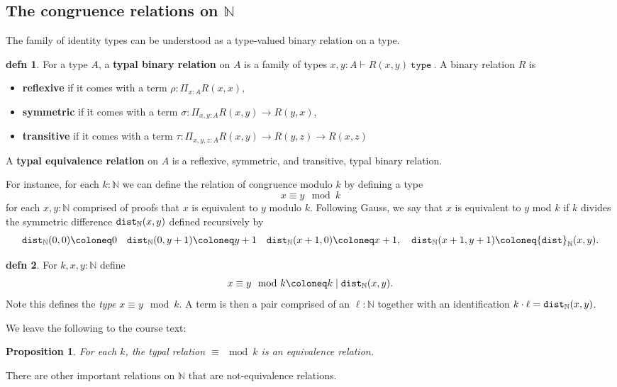 \documentclass{amsart}
\theoremstyle{theorem}
\newtheorem*{prop}{Proposition}
\theoremstyle{definition}
\newtheorem*{defn}{defn}
\theoremstyle{remark}
\newcommand{\0}{\mathbbe{0}}
\newcommand{\1}{\mathbbe{1}}
\newcommand{\2}{\mathbbe{2}}
\newcommand{\3}{\mathbbe{3}}
\newcommand{\4}{\mathbbe{4}}
\newcommand{\univ}{{~\texttt{type}~}}
\newcommand{\term}[1]{{\textup{\texttt{#1}}}}
\newcommand{\bN}{{\mathbb{N}}}
\begin{document}
\subsection*{The congruence relations on \texorpdfstring{$\bN$}{N}}

The family of identity types can be understood as a type-valued binary relation on a type.

\begin{defn} For a type $A$, a \textbf{typal binary relation} on $A$ is a family of types $x, y : A \vdash R(x,y) \univ$. A binary relation $R$ is 
\begin{itemize}
\item \textbf{reflexive} if it comes with a term $\rho : \Pi_{x :A} R(x,x)$,
\item \textbf{symmetric} if it comes with a term $\sigma : \Pi_{x,y :A} R(x,y) \to R(y,x)$,
\item \textbf{transitive} if it comes with a term $\tau : \Pi_{x,y,z : A}  R(x,y) \to R(y,z) \to R(x,z)$
\end{itemize}
A \textbf{typal equivalence relation} on $A$ is a reflexive, symmetric, and transitive, typal binary relation.
\end{defn}

For instance, for each $k : \bN$ we can define the relation of congruence modulo $k$ by defining a type
\[ x \equiv y \mod k\]
for each $x,y : \bN$ comprised of proofs that $x$ is equivalent to $y$ modulo $k$. Following Gauss, we say that $x$ is equivalent to $y$ mod $k$ if $k$ divides the symmetric difference $\term{dist}_\bN(x,y)$ defined recursively by
\[ \term{dist}_\bN(0,0) \coloneq 0 \quad \term{dist}_\bN(0, y+1) \coloneq y+1 \quad \term{dist}_\bN(x+1,0) \coloneq x+1, \quad \term{dist}_\bN(x+1,y+1) \coloneq \term{dist}_\bN(x,y).\]

\begin{defn} For $k,x,y : \bN$ define
\[ x \equiv y \mod k \coloneq k \mid \term{dist}_\bN(x,y).\]
Note this defines the \emph{type} $x \equiv y \mod k$. A term is then a pair comprised of an $\ell : \bN$ together with an identification $k \cdot \ell = \term{dist}_\bN(x,y)$.
\end{defn}

We leave the following to the course text:

\begin{prop} For each $k$, the typal relation $\equiv \mod k$ is an equivalence relation.
\end{prop}

There are other important relations on $\bN$ that are not-equivalence relations.
\end{document}
